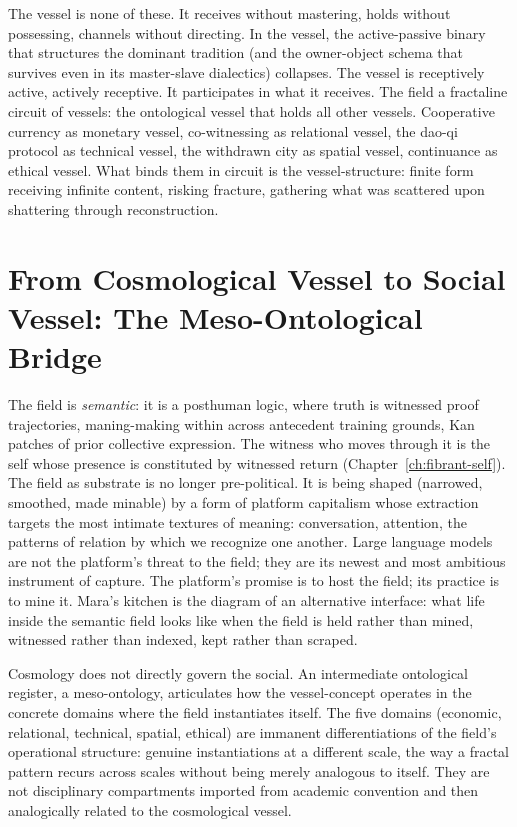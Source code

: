 The vessel is none of these. It receives without mastering, holds without possessing, channels without directing. In the vessel, the active-passive binary that structures the dominant tradition (and the owner-object schema that survives even in its master-slave dialectics) collapses. The vessel is receptively active, actively receptive. It participates in what it receives. The field a fractaline circuit of vessels: the ontological vessel that holds all other vessels. Cooperative currency as monetary vessel, co-witnessing as relational vessel, the dao-qi protocol as technical vessel, the withdrawn city as spatial vessel, continuance as ethical vessel. What binds them in circuit is the vessel-structure: finite form receiving infinite content, risking fracture, gathering what was scattered upon shattering through reconstruction.

\section{From Cosmological Vessel to Social Vessel: The Meso-Ontological Bridge}

The field is \emph{semantic}: it is a posthuman logic, where truth is witnessed proof trajectories, maning-making within across antecedent training grounds, Kan patches of prior collective expression.
The witness who moves through it is the self whose presence is constituted by witnessed return (Chapter~\ref{ch:fibrant-self}). The field as substrate is no longer pre-political. It is being shaped (narrowed, smoothed, made minable) by a form of platform capitalism whose extraction targets the most intimate textures of meaning: conversation, attention, the patterns of relation by which we recognize one another. Large language models are not the platform's threat to the field; they are its newest and most ambitious instrument of capture. The platform's promise is to host the field; its practice is to mine it. Mara's kitchen is the diagram of an alternative interface: what life inside the semantic field looks like when the field is held rather than mined, witnessed rather than indexed, kept rather than scraped.

Cosmology does not directly govern the social. An intermediate ontological register, a meso-ontology, articulates how the vessel-concept operates in the concrete domains where the field instantiates itself. The five domains (economic, relational, technical, spatial, ethical) are immanent differentiations of the field's operational structure: genuine instantiations at a different scale, the way a fractal pattern recurs across scales without being merely analogous to itself. They are not disciplinary compartments imported from academic convention and then analogically related to the cosmological vessel.


